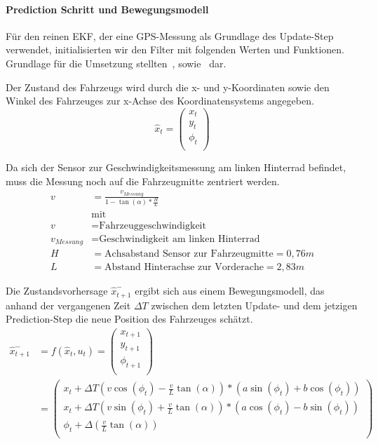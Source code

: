 \documentclass[11pt]{article}
\begin{document}
\paragraph{Prediction Schritt und Bewegungsmodell}
Für den reinen EKF, der eine GPS-Messung als Grundlage des Update-Step verwendet, initialisierten wir den Filter mit folgenden Werten und Funktionen. Grundlage für die Umsetzung stellten~\cite{ute_SLAM}, sowie~\cite{Freiburg_SLAM_Formeln} dar.

Der Zustand des Fahrzeugs wird durch die x- und y-Koordinaten sowie den Winkel des Fahrzeuges zur x-Achse des Koordinatensystems angegeben.
\begin{equation}\label{EKF-State-Vector}
	\hat{x}_t = \begin{pmatrix}
		x_t \\
		y_t \\
		\phi_t \\
	  \end{pmatrix}
\end{equation}

Da sich der Sensor zur Geschwindigkeitsmessung am linken Hinterrad befindet, muss die Messung noch auf die Fahrzeugmitte zentriert werden.
\begin{equation}\label{Geschwindikeit}
\begin{split}
	v &= \frac{v_{Messung}}{1-\tan(\alpha)*\frac{H}{L}} \\
	&\text{mit } \\
	v &= \text{Fahrzeuggeschwindigkeit} \\
	v_{Messung} &= \text{Geschwindigkeit am linken Hinterrad} \\
	H &= \text{Achsabstand Sensor zur Fahrzeugmitte} = 0,76m \\
	L &= \text{Abstand Hinterachse zur Vorderache} = 2,83m
\end{split}
\end{equation}

Die Zustandsvorhersage $\hat{x}_{t+1}^-$ ergibt sich aus einem Bewegungsmodell, das anhand der vergangenen Zeit $\Delta T$ zwischen dem letzten Update- und dem jetzigen Prediction-Step die neue Position des Fahrzeuges schätzt. 
\begin{equation}\label{EKF-Motion-Model}
\begin{split}
	\hat{x}_{t+1}^- &= f(\hat{x}_{t},u_t) = \begin{pmatrix}
		x_{t+1} \\
		y_{t+1} \\
		\phi_{t+1} \\
	  \end{pmatrix} \\
	  &= \begin{pmatrix}
		  x_{t}+\Delta T(v\cos(\phi_t)-\frac{v}{L}\tan(\alpha))*(a\sin(\phi_t)+b\cos(\phi_t)) \\
		  x_{t}+\Delta T(v\sin(\phi_t)+\frac{v}{L}\tan(\alpha))*(a\cos(\phi_t)-b\sin(\phi_t)) \\
		  \phi_t + \Delta(\frac{v}{L}\tan(\alpha)) \\
	  \end{pmatrix}
\end{split}
\end{equation}
\end{document}
